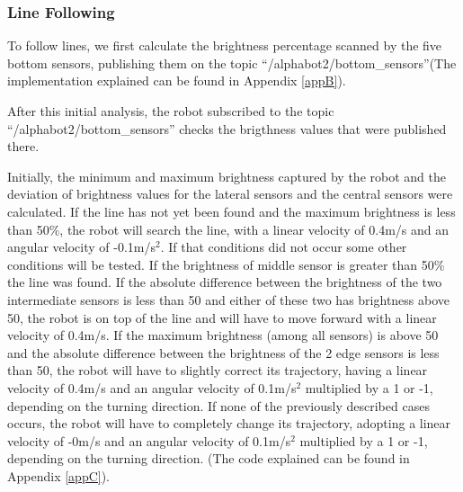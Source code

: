 \documentclass[conference]{IEEEtran}
\begin{document}
\subsubsection{Line Following} \label{line}

To follow lines, we first calculate the brightness percentage scanned by the five bottom sensors, publishing them on the topic ``/alphabot2/bottom\_sensors''(The implementation explained can be found in Appendix \ref{appB}).

After this initial analysis, the robot subscribed to the topic ``/alphabot2/bottom\_sensors'' checks the brigthness values that were published there.

Initially, the minimum and maximum brightness captured by the robot and the deviation of brightness values for the lateral sensors and the central sensors were calculated. If the line has not yet been found and the maximum brightness is less than 50\%, the robot will search the line, with a linear velocity of 0.4m/s and an angular velocity of -0.1m/s$^{2}$. If that conditions did not occur some other conditions will be tested. If the brightness of middle sensor is greater than 50\% the line was found.
If the absolute difference between the brightness of the two intermediate sensors is less than 50 and either of these two has brightness above 50, the robot is on top of the line and will have to move forward with a linear velocity of 0.4m/s.
If the maximum brightness (among all sensors) is above 50 and the absolute difference between the brightness of the 2 edge sensors is less than 50, the robot will have to slightly correct its trajectory, having a linear velocity of 0.4m/s and an angular velocity of 0.1m/s$^{2}$ multiplied by a 1 or -1, depending on the turning direction.
If none of the previously described cases occurs, the robot will have to completely change its trajectory, adopting a linear velocity of -0m/s and an angular velocity of 0.1m/s$^{2}$ multiplied by a 1 or -1, depending on the turning direction. (The code explained can be found in Appendix \ref{appC}).
\end{document}
